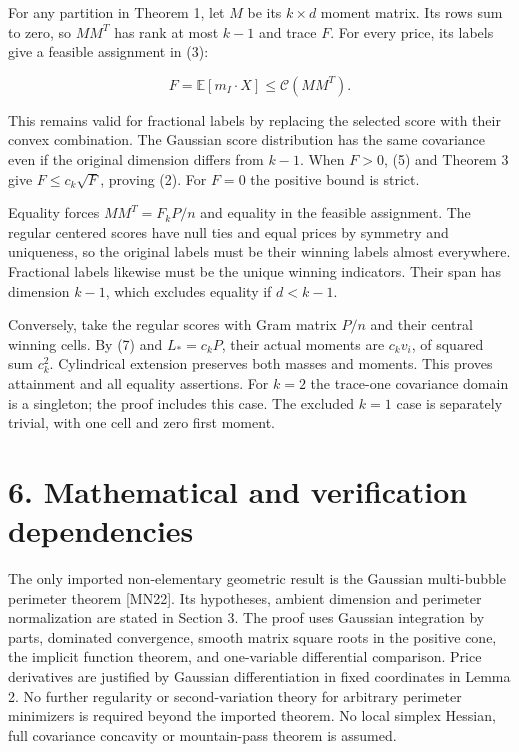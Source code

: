 \documentclass[
  11pt,
]{article}
\begin{document}
For any partition in Theorem 1, let \(M\) be its \(k\times d\) moment
matrix. Its rows sum to zero, so \(MM^T\) has rank at most \(k-1\) and
trace \(F\). For every price, its labels give a feasible assignment in
(3):

\[
 F=\mathbb E[m_I\cdot X]\le\mathcal C(MM^T).
\]

This remains valid for fractional labels by replacing the selected score
with their convex combination. The Gaussian score distribution has the
same covariance even if the original dimension differs from \(k-1\).
When \(F>0\), (5) and Theorem 3 give \(F\le c_k\sqrt F\), proving (2).
For \(F=0\) the positive bound is strict.

Equality forces \(MM^T=F_kP/n\) and equality in the feasible assignment.
The regular centered scores have null ties and equal prices by symmetry
and uniqueness, so the original labels must be their winning labels
almost everywhere. Fractional labels likewise must be the unique winning
indicators. Their span has dimension \(k-1\), which excludes equality if
\(d<k-1\).

Conversely, take the regular scores with Gram matrix \(P/n\) and their
central winning cells. By (7) and \(L_*=c_kP\), their actual moments are
\(c_kv_i\), of squared sum \(c_k^2\). Cylindrical extension preserves
both masses and moments. This proves attainment and all equality
assertions. For \(k=2\) the trace-one covariance domain is a singleton;
the proof includes this case. The excluded \(k=1\) case is separately
trivial, with one cell and zero first moment.

\section{6. Mathematical and verification
dependencies}\label{mathematical-and-verification-dependencies}

The only imported non-elementary geometric result is the Gaussian
multi-bubble perimeter theorem {[}MN22{]}. Its hypotheses, ambient
dimension and perimeter normalization are stated in Section 3. The proof
uses Gaussian integration by parts, dominated convergence, smooth matrix
square roots in the positive cone, the implicit function theorem, and
one-variable differential comparison. Price derivatives are justified by
Gaussian differentiation in fixed coordinates in Lemma 2. No further
regularity or second-variation theory for arbitrary perimeter minimizers
is required beyond the imported theorem. No local simplex Hessian, full
covariance concavity or mountain-pass theorem is assumed.
\end{document}
